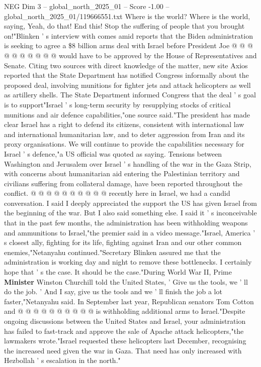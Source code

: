 \begin{textsample}{NEG Dim 3 – global\_north\_2025\_01 – Score -1.00 – global\_north\_2025\_01/119666551.txt}
Where is the world?
Where is the world, saying, Yeah, do that!
End this!
Stop the suffering of people that you brought on!"Blinken ' s interview with comes amid reports that the Biden administration is seeking to agree a \$8 billion arms deal with Israel before President Joe @ @ @ @ @ @ @ @ @ @ would have to be approved by the House of Representatives and Senate.
Citing two sources with direct knowledge of the matter, new site Axios reported that the State Department has notified Congress informally about the proposed deal, involving munitions for fighter jets and attack helicopters as well as artillery shells.
The State Department informed Congress that the deal ' s goal is to support"Israel ' s long-term security by resupplying stocks of critical munitions and air defence capabilities,"one source said."The president has made clear Israel has a right to defend its citizens, consistent with international law and international humanitarian law, and to deter aggression from Iran and its proxy organisations.
We will continue to provide the capabilities necessary for Israel ' s defence,"a US official was quoted as saying.
Tensions between Washington and Jerusalem over Israel ' s handling of the war in the Gaza Strip, with concerns about humanitarian aid entering the Palestinian territory and civilians suffering from collateral damage, have been reported throughout the conflict. @ @ @ @ @ @ @ @ @ @ recently here in Israel, we had a candid conversation.
I said I deeply appreciated the support the US has given Israel from the beginning of the war.
But I also said something else.
I said it ' s inconceivable that in the past few months, the administration has been withholding weapons and ammunitions to Israel,"the premier said in a video message."Israel, America ' s closest ally, fighting for its life, fighting against Iran and our other common enemies,"Netanyahu continued."Secretary Blinken assured me that the administration is working day and night to remove these bottlenecks.
I certainly hope that ' s the case.
It should be the case."During World War II, Prime \textbf{Minister} Winston Churchill told the United States, ' Give us the tools, we ' ll do the job. ' And I say, give us the tools and we ' ll finish the job a lot faster,"Netanyahu said.
In September last year, Republican senators Tom Cotton and @ @ @ @ @ @ @ @ @ @ is withholding additional arms to Israel."Despite ongoing discussions between the United States and Israel, your administration has failed to fast-track and approve the sale of Apache attack helicopters,"the lawmakers wrote."Israel requested these helicopters last December, recognising the increased need given the war in Gaza.
That need has only increased with Hezbollah ' s escalation in the north."

\end{textsample}
